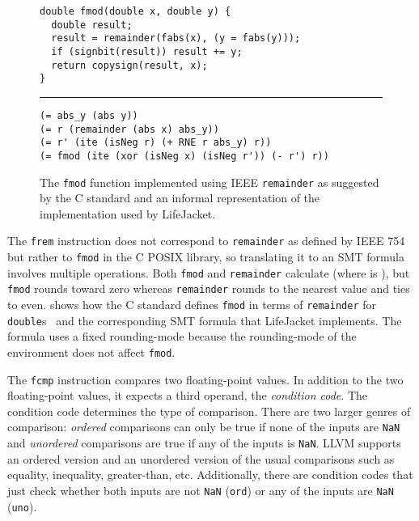 \documentclass[preprint, numbers]{sigplanconf}
\newcommand{\xxx}{LifeJacket}
\begin{document}
\begin{figure}
\small

\begin{Verbatim}
double fmod(double x, double y) {
  double result;
  result = remainder(fabs(x), (y = fabs(y)));
  if (signbit(result)) result += y;
  return copysign(result, x);
}
\end{Verbatim}
\vspace{-0.2cm}
\noindent\rule{\columnwidth}{0.4pt}
\begin{Verbatim}
(= abs_y (abs y))
(= r (remainder (abs x) abs_y))
(= r' (ite (isNeg r) (+ RNE r abs_y) r))
(= fmod (ite (xor (isNeg x) (isNeg r')) (- r') r))
\end{Verbatim}

\caption{The \texttt{fmod} function implemented using IEEE \texttt{remainder}
as suggested by the C standard and an informal representation of the implementation used by \xxx{}.}

\label{fig:fmod}
\end{figure}

The \texttt{frem} instruction does not correspond to \texttt{remainder} as
defined by IEEE 754 but rather to \texttt{fmod} in the C POSIX library, so
translating it to an SMT formula involves multiple operations.  Both
\texttt{fmod} and \texttt{remainder} calculate  (where  is
), but \texttt{fmod} rounds toward zero whereas \texttt{remainder}
rounds to the nearest value and ties to even.  shows how the C
standard defines \texttt{fmod} in terms of \texttt{remainder} for
\texttt{double}s~\cite[\S F.10.7.1]{c11} and the corresponding SMT formula that
\xxx{} implements. The formula uses a fixed rounding-mode because the
rounding-mode of the environment does not affect \texttt{fmod}.

The \texttt{fcmp} instruction compares two floating-point values. In addition
to the two floating-point values, it expects a third operand, the
\emph{condition code}. The condition code determines the type of comparison.
There are two larger genres of comparison: \emph{ordered} comparisons can only
be true if none of the inputs are \texttt{NaN} and \emph{unordered} comparisons
are true if any of the inputs is \texttt{NaN}. LLVM supports an ordered version
and an unordered version of the usual comparisons such as equality, inequality,
greater-than, etc. Additionally, there are condition codes that just check
whether both inputs are not \texttt{NaN} (\texttt{ord}) or any of the inputs
are \texttt{NaN} (\texttt{uno}).
\end{document}
